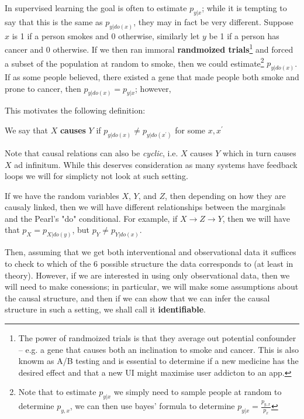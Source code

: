 In supervised learning the goal is often to estimate $p_{y|x}$; while it is tempting to say that this is the 
same as $p_{y|do(x)}$, they may in fact be very different. Suppose $x$ is 1 if a person smokes and 0 otherwise, 
similarly let $y$ be 1 if a person has cancer and 0 otherwise. If we then ran immoral 
\textbf{randmoized trials}\footnote{The power of randmoized trials is that they average out potential confounder 
-- e.g. a gene that causes both an inclination to smoke and cancer. This is also knowm as A/B testing and is 
essential to determine if a new medicine has the desired effect and that a new UI might maximise user addicton 
to an app.} and forced a subset of the population at random to smoke, then we could estimate\footnote{
Note that to estimate $p_{y|x}$ we simply need to sample people at random to determine $p_{y, x}$, we can 
then use bayes' formula to determine $p_{y|x} = \frac{p_{y, x}}{p_x}$
} $p_{y|do(x)}$. 
If as some people believed, there existed a gene that made people both smoke and prone to cancer, then 
$p_{y|do(x)} = p_{y|x}$; however, 

This motivates the following definition:

\begin{definition}
    We say that $X$ \textbf{causes} $Y$ if $p_{y|do(x)} \neq p_{y|do(x^\prime)}$ for some
    $x, x^\prime$
\end{definition}

Note that causal relations can also be \textit{cyclic}, i.e. $X$ causes $Y$ which in turn causes 
$X$ ad infinitum. While this deserves consideration as many systems have feedback loops we will
for simplicty not look at such setting.

If we have the random variables $X$, $Y$, and $Z$, then depending on how they are causaly linked, then 
we will have different relationships between the marginals and the Pearl's "do" conditional. For example,
if $X \rightarrow Z \rightarrow Y$, then we will have that $p_X = p_{X|do(y)}$, but $p_Y \neq p_{Y|do(x)}$. 

Then, assuming that we get both interventional and observational data it suffices to check to which of the 6 
possible structure the data corresponds to (at least in theory). However, if we are interested in using only 
observational data, then we will need to make conessions; in particular, we will make some assumptions about 
the causal structure, and then if we can show that we can infer the causal structure in such a setting, we 
shall call it \textbf{identifiable}.

